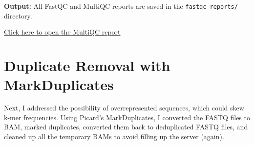 \documentclass[
]{book}
\begin{document}
\textbf{Output:} All FastQC and MultiQC reports are saved in the \texttt{fastqc\_reports/} directory.

\href{files/multiqc_report.html}{Click here to open the MultiQC report}

\hypertarget{duplicate-removal-with-markduplicates}{%
\section{Duplicate Removal with MarkDuplicates}\label{duplicate-removal-with-markduplicates}}

Next, I addressed the possibility of overrepresented sequences, which could skew k-mer frequencies. Using Picard's MarkDuplicates, I converted the FASTQ files to BAM, marked duplicates, converted them back to deduplicated FASTQ files, and cleaned up all the temporary BAMs to avoid filling up the server (again).
\end{document}
